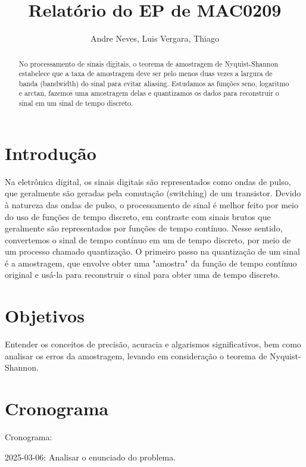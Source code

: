 \documentclass{article}
\title{Relatório do EP de MAC0209}
\author{Andre Neves, Luis Vergara, Thiago}
\begin{document}
\maketitle


\begin{abstract}
No processamento de sinais digitais, o teorema de amostragem de Nyquist-Shannon estabelece que a taxa de amostragem deve ser pelo menos duas vezes a largura de banda (bandwidth) do sinal para evitar aliasing.
Estudamos as funções seno, logaritmo e arctan, fazemos uma amostragem delas e quantizamos os dados para reconstruir o sinal em um sinal de tempo discreto.

\end{abstract}

\newpage

\tableofcontents

\newpage

\section{Introdução}

Na eletrônica digital, os sinais digitais são representados como ondas de pulso, que geralmente são geradas pela comutação (switching) de um transistor.
Devido à natureza das ondas de pulso, o processamento de sinal é melhor feito por meio do uso de funções de tempo discreto, em contraste com sinais brutos que geralmente são representados por funções de tempo contínuo.
Nesse sentido, convertemos o sinal de tempo contínuo em um de tempo discreto, por meio de um processo chamado quantização.
O primeiro passo na quantização de um sinal é a amostragem, que envolve obter uma "amostra" da função de tempo contínuo original e usá-la para reconstruir o sinal para obter uma de tempo discreto.

\section{Objetivos}

Entender os conceitos de precisão, acuracia e algarismos significativos, bem como analisar os erros da amostragem, levando em consideração o teorema de Nyquist-Shannon.

\section{Cronograma}

Cronograma:  

2025-03-06: Analisar o enunciado do problema.  
\end{document}
